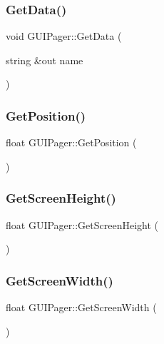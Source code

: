 \hypertarget{class_g_u_i_pager_a88ae24d3ba8c4d200ccb5d1e0b99c266}{}\label{class_g_u_i_pager_a88ae24d3ba8c4d200ccb5d1e0b99c266} 
\subsubsection{\texorpdfstring{Get\+Data()}{GetData()}}
{\footnotesize\ttfamily void G\+U\+I\+Pager\+::\+Get\+Data (\begin{DoxyParamCaption}\item[{string \&out}]{name }\end{DoxyParamCaption})}

\hypertarget{class_g_u_i_pager_a648d99e4c3b4795914b6f6ac0fd8f403}{}\label{class_g_u_i_pager_a648d99e4c3b4795914b6f6ac0fd8f403} 
\subsubsection{\texorpdfstring{Get\+Position()}{GetPosition()}}
{\footnotesize\ttfamily float G\+U\+I\+Pager\+::\+Get\+Position (\begin{DoxyParamCaption}{ }\end{DoxyParamCaption})}

\hypertarget{class_g_u_i_pager_a219d53215f256042bcc8ab60a86894d7}{}\label{class_g_u_i_pager_a219d53215f256042bcc8ab60a86894d7} 
\subsubsection{\texorpdfstring{Get\+Screen\+Height()}{GetScreenHeight()}}
{\footnotesize\ttfamily float G\+U\+I\+Pager\+::\+Get\+Screen\+Height (\begin{DoxyParamCaption}{ }\end{DoxyParamCaption})}

\hypertarget{class_g_u_i_pager_acd202cb9efb6bf4db191e7baafe8cd31}{}\label{class_g_u_i_pager_acd202cb9efb6bf4db191e7baafe8cd31} 
\subsubsection{\texorpdfstring{Get\+Screen\+Width()}{GetScreenWidth()}}
{\footnotesize\ttfamily float G\+U\+I\+Pager\+::\+Get\+Screen\+Width (\begin{DoxyParamCaption}{ }\end{DoxyParamCaption})}

